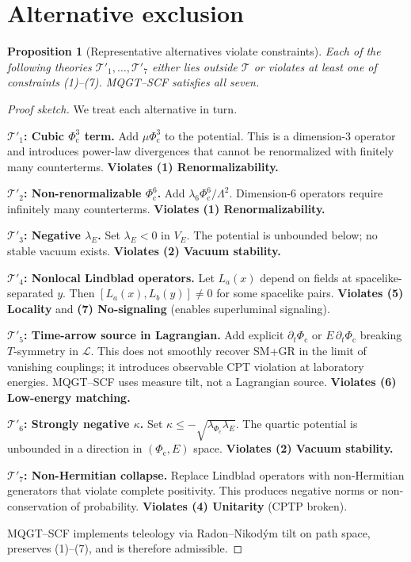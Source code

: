 \documentclass[11pt]{article}
\newtheorem{proposition}{Proposition}
\theoremstyle{remark}
\newcommand{\Phic}{\Phi_{\mathrm{c}}}
\newcommand{\Eth}{E}
\newcommand{\Lag}{\mathcal{L}}
\newcommand{\cT}{\mathcal{T}}
\begin{document}
\section{Alternative exclusion}

\begin{proposition}[Representative alternatives violate constraints]
\label{prop:alternatives}
Each of the following theories $\cT'_1,\ldots,\cT'_7$ either lies outside $\cT$ or violates at least one of constraints (1)--(7). MQGT--SCF satisfies all seven.
\end{proposition}

\begin{proof}[Proof sketch]
We treat each alternative in turn.

\textbf{$\cT'_1$: Cubic $\Phic^3$ term.} Add $\mu\Phic^3$ to the potential. This is a dimension-3 operator and introduces power-law divergences that cannot be renormalized with finitely many counterterms. \textbf{Violates (1) Renormalizability.}

\textbf{$\cT'_2$: Non-renormalizable $\Phic^6$.} Add $\lambda_6 \Phic^6/\Lambda^2$. Dimension-6 operators require infinitely many counterterms. \textbf{Violates (1) Renormalizability.}

\textbf{$\cT'_3$: Negative $\lambda_{\Eth}$.} Set $\lambda_{\Eth} < 0$ in $V_{\Eth}$. The potential is unbounded below; no stable vacuum exists. \textbf{Violates (2) Vacuum stability.}

\textbf{$\cT'_4$: Nonlocal Lindblad operators.} Let $L_a(x)$ depend on fields at spacelike-separated $y$. Then $[L_a(x),L_b(y)] \neq 0$ for some spacelike pairs. \textbf{Violates (5) Locality} and \textbf{(7) No-signaling} (enables superluminal signaling).

\textbf{$\cT'_5$: Time-arrow source in Lagrangian.} Add explicit $\partial_t\Phic$ or $E\,\partial_t\Phic$ breaking $T$-symmetry in $\Lag$. This does not smoothly recover SM+GR in the limit of vanishing couplings; it introduces observable CPT violation at laboratory energies. MQGT--SCF uses measure tilt, not a Lagrangian source. \textbf{Violates (6) Low-energy matching.}

\textbf{$\cT'_6$: Strongly negative $\kappa$.} Set $\kappa \le -\sqrt{\lambda_{\Phic}\lambda_{\Eth}}$. The quartic potential is unbounded in a direction in $(\Phic,\Eth)$ space. \textbf{Violates (2) Vacuum stability.}

\textbf{$\cT'_7$: Non-Hermitian collapse.} Replace Lindblad operators with non-Hermitian generators that violate complete positivity. This produces negative norms or non-conservation of probability. \textbf{Violates (4) Unitarity} (CPTP broken).

MQGT--SCF implements teleology via Radon--Nikod\'ym tilt on path space, preserves (1)--(7), and is therefore admissible.
\end{proof}
\end{document}
